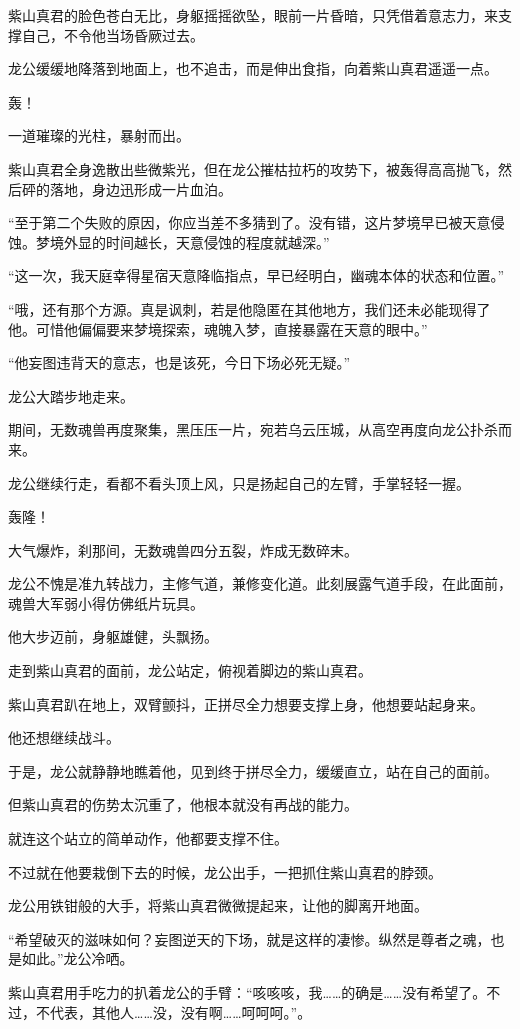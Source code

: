\begin{this_body}
紫山真君的脸色苍白无比，身躯摇摇欲坠，眼前一片昏暗，只凭借着意志力，来支撑自己，不令他当场昏厥过去。

龙公缓缓地降落到地面上，也不追击，而是伸出食指，向着紫山真君遥遥一点。

轰！

一道璀璨的光柱，暴射而出。

紫山真君全身逸散出些微紫光，但在龙公摧枯拉朽的攻势下，被轰得高高抛飞，然后砰的落地，身边迅形成一片血泊。

“至于第二个失败的原因，你应当差不多猜到了。没有错，这片梦境早已被天意侵蚀。梦境外显的时间越长，天意侵蚀的程度就越深。”

“这一次，我天庭幸得星宿天意降临指点，早已经明白，幽魂本体的状态和位置。”

“哦，还有那个方源。真是讽刺，若是他隐匿在其他地方，我们还未必能现得了他。可惜他偏偏要来梦境探索，魂魄入梦，直接暴露在天意的眼中。”

“他妄图违背天的意志，也是该死，今日下场必死无疑。”

龙公大踏步地走来。

期间，无数魂兽再度聚集，黑压压一片，宛若乌云压城，从高空再度向龙公扑杀而来。

龙公继续行走，看都不看头顶上风，只是扬起自己的左臂，手掌轻轻一握。

轰隆！

大气爆炸，刹那间，无数魂兽四分五裂，炸成无数碎末。

龙公不愧是准九转战力，主修气道，兼修变化道。此刻展露气道手段，在此面前，魂兽大军弱小得仿佛纸片玩具。

他大步迈前，身躯雄健，头飘扬。

走到紫山真君的面前，龙公站定，俯视着脚边的紫山真君。

紫山真君趴在地上，双臂颤抖，正拼尽全力想要支撑上身，他想要站起身来。

他还想继续战斗。

于是，龙公就静静地瞧着他，见到终于拼尽全力，缓缓直立，站在自己的面前。

但紫山真君的伤势太沉重了，他根本就没有再战的能力。

就连这个站立的简单动作，他都要支撑不住。

不过就在他要栽倒下去的时候，龙公出手，一把抓住紫山真君的脖颈。

龙公用铁钳般的大手，将紫山真君微微提起来，让他的脚离开地面。

“希望破灭的滋味如何？妄图逆天的下场，就是这样的凄惨。纵然是尊者之魂，也是如此。”龙公冷哂。

紫山真君用手吃力的扒着龙公的手臂：“咳咳咳，我……的确是……没有希望了。不过，不代表，其他人……没，没有啊……呵呵呵。”。


\end{this_body}
